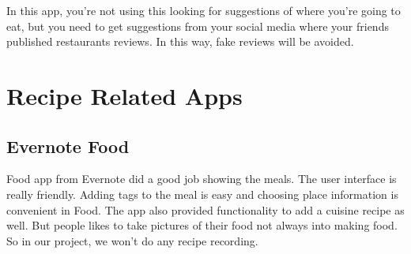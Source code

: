 In this app, you're not using this looking for suggestions of where you're going to eat, but you need to get suggestions from your social media where your friends published restaurants reviews. In this way, fake reviews will be avoided. \\
\newpage
\section{Recipe Related Apps} %
\label{awx:receipe_related_apps}
\subsection{Evernote Food} %
\label{sub:evernote_food}

Food app from Evernote did a good job showing the meals. The user interface is really friendly. Adding tags to the meal is easy and choosing place information is convenient in Food.  The app also provided functionality to add a cuisine recipe as well. But people likes to take pictures of their food not always into making food. So in our project, we won't do any recipe recording.





